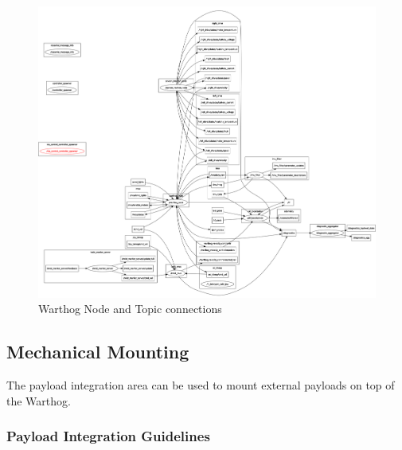 \documentclass[]{clearpath-latex/clearpath-manual}
\begin{document}
\begin{figure}[!htb]
  \centering
  \includegraphics[width=0.75\linewidth]{graphics/rqt-graph.png}
  \caption{Warthog Node and Topic connections}
  \label{fig:rqt-graph}
\end{figure}
\clearpage

\pagebreak[4]
\subsection{Mechanical Mounting}
\label{mechanical}

The payload integration area can be used to mount external payloads on top of the Warthog.


\subsubsection{Payload Integration Guidelines}
\end{document}
